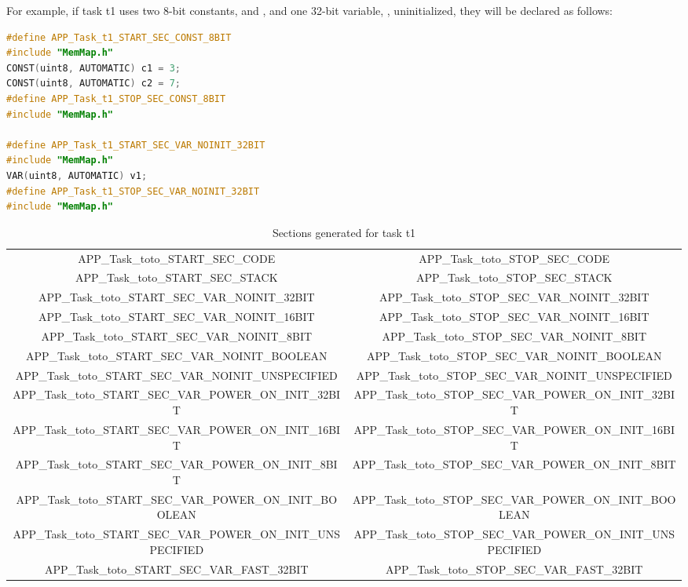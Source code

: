For example, if task t1 uses two 8-bit constants,  and , and one 32-bit variable, , uninitialized, they will be declared as follows:

\begin{lstlisting}[language=C]
#define APP_Task_t1_START_SEC_CONST_8BIT
#include "MemMap.h"
CONST(uint8, AUTOMATIC) c1 = 3;
CONST(uint8, AUTOMATIC) c2 = 7;
#define APP_Task_t1_STOP_SEC_CONST_8BIT
#include "MemMap.h"

#define APP_Task_t1_START_SEC_VAR_NOINIT_32BIT
#include "MemMap.h"
VAR(uint8, AUTOMATIC) v1;
#define APP_Task_t1_STOP_SEC_VAR_NOINIT_32BIT
#include "MemMap.h"
\end{lstlisting}



\begin{table}[htp]
\caption{Sections generated for task t1}
\begin{center}\scriptsize
\begin{tabular}{|c|c|}
\hline
APP_Task_toto_START_SEC_CODE & APP_Task_toto_STOP_SEC_CODE \\
APP_Task_toto_START_SEC_STACK & APP_Task_toto_STOP_SEC_STACK \\
APP_Task_toto_START_SEC_VAR_NOINIT_32BIT & APP_Task_toto_STOP_SEC_VAR_NOINIT_32BIT \\
APP_Task_toto_START_SEC_VAR_NOINIT_16BIT & APP_Task_toto_STOP_SEC_VAR_NOINIT_16BIT \\
APP_Task_toto_START_SEC_VAR_NOINIT_8BIT & APP_Task_toto_STOP_SEC_VAR_NOINIT_8BIT \\
APP_Task_toto_START_SEC_VAR_NOINIT_BOOLEAN & APP_Task_toto_STOP_SEC_VAR_NOINIT_BOOLEAN \\
APP_Task_toto_START_SEC_VAR_NOINIT_UNSPECIFIED & APP_Task_toto_STOP_SEC_VAR_NOINIT_UNSPECIFIED \\
APP_Task_toto_START_SEC_VAR_POWER_ON_INIT_32BIT & APP_Task_toto_STOP_SEC_VAR_POWER_ON_INIT_32BIT \\
APP_Task_toto_START_SEC_VAR_POWER_ON_INIT_16BIT & APP_Task_toto_STOP_SEC_VAR_POWER_ON_INIT_16BIT \\
APP_Task_toto_START_SEC_VAR_POWER_ON_INIT_8BIT & APP_Task_toto_STOP_SEC_VAR_POWER_ON_INIT_8BIT \\
APP_Task_toto_START_SEC_VAR_POWER_ON_INIT_BOOLEAN & APP_Task_toto_STOP_SEC_VAR_POWER_ON_INIT_BOOLEAN \\
APP_Task_toto_START_SEC_VAR_POWER_ON_INIT_UNSPECIFIED & APP_Task_toto_STOP_SEC_VAR_POWER_ON_INIT_UNSPECIFIED \\
APP_Task_toto_START_SEC_VAR_FAST_32BIT & APP_Task_toto_STOP_SEC_VAR_FAST_32BIT \\

\end{tabular}
\end{center}
\end{table}
